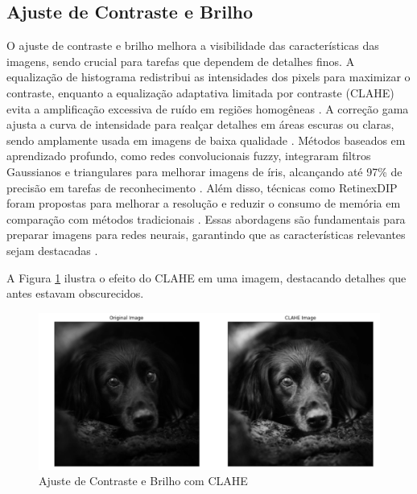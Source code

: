 \subsection{Ajuste de Contraste e Brilho}
O ajuste de contraste e brilho melhora a visibilidade das características das imagens, sendo crucial para tarefas que dependem de detalhes finos. A equalização de histograma redistribui as intensidades dos pixels para maximizar o contraste, enquanto a equalização adaptativa limitada por contraste (CLAHE) evita a amplificação excessiva de ruído em regiões homogêneas \cite{sciencedirect2023normalization}. A correção gama ajusta a curva de intensidade para realçar detalhes em áreas escuras ou claras, sendo amplamente usada em imagens de baixa qualidade \cite{sciencedirect2023normalization}. Métodos baseados em aprendizado profundo, como redes convolucionais fuzzy, integraram filtros Gaussianos e triangulares para melhorar imagens de íris, alcançando até 97\% de precisão em tarefas de reconhecimento \cite{sharma2024deep}. Além disso, técnicas como RetinexDIP foram propostas para melhorar a resolução e reduzir o consumo de memória em comparação com métodos tradicionais \cite{sharma2024deep}. Essas abordagens são fundamentais para preparar imagens para redes neurais, garantindo que as características relevantes sejam destacadas \cite{sciencedirect2023normalization}.

A Figura \ref{fig:clahe} ilustra o efeito do CLAHE em uma imagem, destacando detalhes que antes estavam obscurecidos.

\begin{figure}[H]
    \centering
    \caption{\label{fig:clahe}Ajuste de Contraste e Brilho com CLAHE}
    \includegraphics[width=1\textwidth]{img/revisao_bibliografica/clahe.png}
\end{figure}

